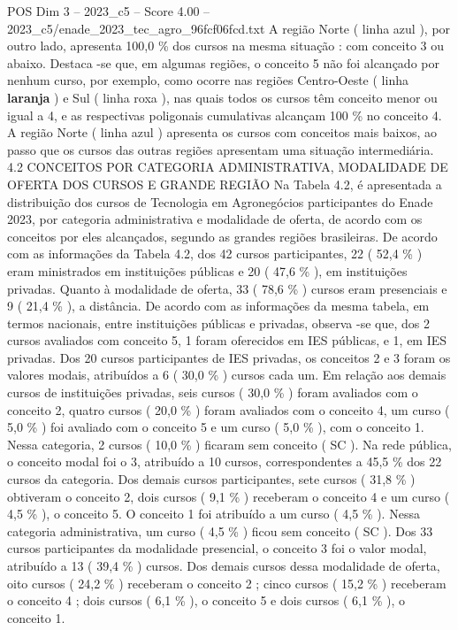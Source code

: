 \begin{textsample}{POS Dim 3 – 2023\_c5 – Score 4.00 – 2023\_c5/enade\_2023\_tec\_agro\_96fcf06fcd.txt}
A região Norte ( linha azul ), por outro lado, apresenta 100,0 \% dos cursos na mesma situação : com conceito 3 ou abaixo.
Destaca -se que, em algumas regiões, o conceito 5 não foi alcançado por nenhum curso, por exemplo, como ocorre nas regiões Centro-Oeste ( linha \textbf{laranja} ) e Sul ( linha roxa ), nas quais todos os cursos têm conceito menor ou igual a 4, e as respectivas poligonais cumulativas alcançam 100 \% no conceito 4.
A região Norte ( linha azul ) apresenta os cursos com conceitos mais baixos, ao passo que os cursos das outras regiões apresentam uma situação intermediária. 4.2 CONCEITOS POR CATEGORIA ADMINISTRATIVA, MODALIDADE DE OFERTA DOS CURSOS E GRANDE REGIÃO Na Tabela 4.2, é apresentada a distribuição dos cursos de Tecnologia em Agronegócios participantes do Enade 2023, por categoria administrativa e modalidade de oferta, de acordo com os conceitos por eles alcançados, segundo as grandes regiões brasileiras.
De acordo com as informações da Tabela 4.2, dos 42 cursos participantes, 22 ( 52,4 \% ) eram ministrados em instituições públicas e 20 ( 47,6 \% ), em instituições privadas.
Quanto à modalidade de oferta, 33 ( 78,6 \% ) cursos eram presenciais e 9 ( 21,4 \% ), a distância.
De acordo com as informações da mesma tabela, em termos nacionais, entre instituições públicas e privadas, observa -se que, dos 2 cursos avaliados com conceito 5, 1 foram oferecidos em IES públicas, e 1, em IES privadas.
Dos 20 cursos participantes de IES privadas, os conceitos 2 e 3 foram os valores modais, atribuídos a 6 ( 30,0 \% ) cursos cada um.
Em relação aos demais cursos de instituições privadas, seis cursos ( 30,0 \% ) foram avaliados com o conceito 2, quatro cursos ( 20,0 \% ) foram avaliados com o conceito 4, um curso ( 5,0 \% ) foi avaliado com o conceito 5 e um curso ( 5,0 \% ), com o conceito 1.
Nessa categoria, 2 cursos ( 10,0 \% ) ficaram sem conceito ( SC ).
Na rede pública, o conceito modal foi o 3, atribuído a 10 cursos, correspondentes a 45,5 \% dos 22 cursos da categoria.
Dos demais cursos participantes, sete cursos ( 31,8 \% ) obtiveram o conceito 2, dois cursos ( 9,1 \% ) receberam o conceito 4 e um curso ( 4,5 \% ), o conceito 5.
O conceito 1 foi atribuído a um curso ( 4,5 \% ).
Nessa categoria administrativa, um curso ( 4,5 \% ) ficou sem conceito ( SC ).
Dos 33 cursos participantes da modalidade presencial, o conceito 3 foi o valor modal, atribuído a 13 ( 39,4 \% ) cursos.
Dos demais cursos dessa modalidade de oferta, oito cursos ( 24,2 \% ) receberam o conceito 2 ; cinco cursos ( 15,2 \% ) receberam o conceito 4 ; dois cursos ( 6,1 \% ), o conceito 5 e dois cursos ( 6,1 \% ), o conceito 1.

\end{textsample}
